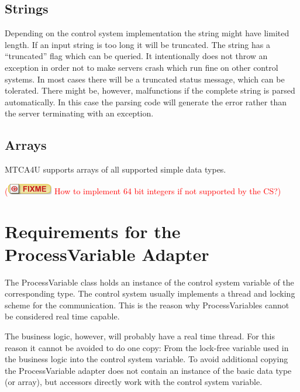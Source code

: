 \documentclass[11pt,a4paper]{scrartcl}
\newcounter{nFixmes}
\newcommand{\fixme}[1]{\addtocounter{nFixmes}{1}\textcolor{red}{(\includegraphics[height=2ex]{fixme} #1)}\xspace}
\begin{document}
\subsection{Strings}

Depending on the control system implementation the string might have limited length. If an input string is too long it will be truncated. The string has a “truncated” flag which can be queried. It intentionally does not throw an exception in order not to make servers crash which run fine on other control systems. In most cases there will be a truncated status message, which can be tolerated. There might be, however, malfunctions if the complete string is parsed automatically. In this case the parsing code will generate the error rather than the server terminating with an exception.

\subsection{Arrays}

MTCA4U supports arrays of all supported simple data types. \fixme{How to implement 64 bit integers if not supported by the CS?}

\section{Requirements for the ProcessVariable Adapter}\label{section_process_variable_adapter}

The ProcessVariable class holds an instance of the control system variable of the corresponding type. The control system usually implements a thread and locking scheme for the communication. This is the reason why ProcessVariables cannot be considered real time capable.

The business logic, however, will probably have a real time thread. For this reason it cannot be avoided to do one copy: From the lock-free variable used in the business logic into the control system variable. To avoid additional copying the ProcessVariable adapter does not contain an instance of the basic data type (or array), but accessors directly work with the control system variable.
\end{document}
